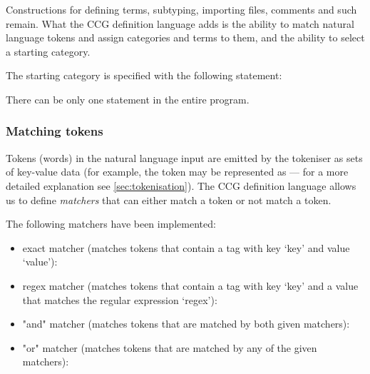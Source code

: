 \documentclass[main.tex]{subfiles}
\begin{document}
Constructions for defining terms, subtyping, importing files, comments and such
remain. What the CCG definition language adds is the ability to match natural
language tokens and assign categories and terms to them, and the ability to
select a starting category.

The starting category is specified with the following statement:
\begin{center}
\end{center}
There can be only one  statement in the entire program.

\subsubsection{Matching tokens}
Tokens (words) in the natural language input are emitted by the
tokeniser as sets of
key-value data (for example, the token  may be represented as
 --- for a more detailed explanation
see \cref{sec:tokenisation}). The CCG definition language allows us to define
\emph{matchers} that can either match a token or not match a token.

The following matchers have been implemented:

\begin{itemize}
    \item exact matcher (matches tokens that contain a tag with key `key'
        and value `value'):
        \begin{center}
        \end{center}
    \item regex matcher (matches tokens that contain a tag with key `key'
        and a value that matches the regular expression `regex'):
        \begin{center}
        \end{center}
    \item "and" matcher (matches tokens that are matched by both given matchers):
        \begin{center}
            \code{ \& }
        \end{center}
    \item "or" matcher (matches tokens that are matched by any of the given matchers):
        \begin{center}
            \code{ | }
        \end{center}
\end{itemize}
\end{document}
